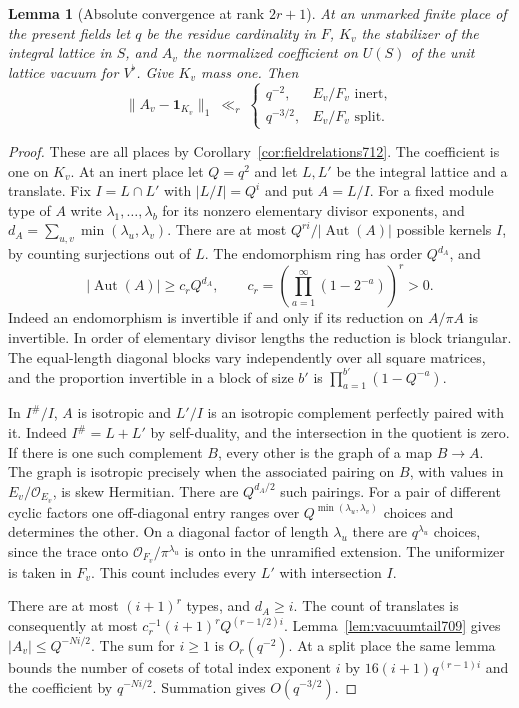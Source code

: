 \documentclass[a4paper,11pt]{article}
\newtheorem{lemma}[proposition]{Lemma}
\theoremstyle{definition}
\theoremstyle{remark}
\numberwithin{equation}{section}
\begin{document}
\begin{lemma}[Absolute convergence at rank \(2r+1\)]
\leavevmode\label{lem:thresholdtail816}
At an unmarked finite place of the present fields let
\(q\) be the residue cardinality in \(F\), \(K_v\) the
stabilizer of the integral lattice in \(S\), and \(A_v\)
the normalized coefficient on \(U(S)\) of the unit lattice
vacuum for \(V^\flat\). Give \(K_v\) mass one. Then
\[
     \|A_v-\mathbf 1_{K_v}\|_1
     \ \ll_r\
     \begin{cases}
       q^{-2},&E_v/F_v\text{ inert},\\
       q^{-3/2},&E_v/F_v\text{ split}.
     \end{cases}
\]
\end{lemma}
\begin{proof}
These are all places by Corollary~\ref{cor:fieldrelations712}.
The coefficient is one on \(K_v\). At an inert place let
\(Q=q^2\) and let \(L,L'\) be the integral lattice and a
translate. Fix \(I=L\cap L'\) with \(|L/I|=Q^i\) and put
\(A=L/I\). For a fixed module type of \(A\) write
\(\lambda_1,\ldots,\lambda_b\) for its nonzero elementary
divisor exponents, and \(d_A=\sum_{u,v}\min(\lambda_u,\lambda_v)\).
There are at most \(Q^{ri}/|\operatorname{Aut}(A)|\)
possible kernels \(I\), by counting surjections out of \(L\).
The endomorphism ring has order \(Q^{d_A}\), and
\[
   |\operatorname{Aut}(A)|\ge c_r Q^{d_A},\qquad
   c_r=\left(\prod_{a=1}^{\infty}(1-2^{-a})\right)^r>0 .
\]
Indeed an endomorphism is invertible if and only if its
reduction on \(A/\pi A\) is invertible. In order of
elementary divisor lengths the reduction is block triangular.
The equal-length diagonal blocks vary independently over
all square matrices, and the proportion invertible in
a block of size \(b'\) is \(\prod_{a=1}^{b'}(1-Q^{-a})\).

In \(I^\#/I\), \(A\) is isotropic and \(L'/I\) is an
isotropic complement perfectly paired with it. Indeed
\(I^\#=L+L'\) by self-duality, and the intersection in
the quotient is zero. If there is one such complement \(B\),
every other is the graph of a map \(B\to A\).
The graph is isotropic precisely when the associated
pairing on \(B\), with values in \(E_v/\mathcal O_{E_v}\),
is skew Hermitian. There are \(Q^{d_A/2}\) such pairings.
For a pair of different cyclic factors one off-diagonal
entry ranges over \(Q^{\min(\lambda_u,\lambda_v)}\) choices
and determines the other. On a diagonal factor of length
\(\lambda_u\) there are \(q^{\lambda_u}\) choices, since
the trace onto \(\mathcal O_{F_v}/\pi^{\lambda_u}\) is onto
in the unramified extension. The uniformizer is taken in
\(F_v\). This count includes every \(L'\) with intersection
\(I\).

There are at most \((i+1)^r\) types, and \(d_A\ge i\).
The count of translates is consequently at most
\(c_r^{-1}(i+1)^r Q^{(r-1/2)i}\). Lemma~\ref{lem:vacuumtail709}
gives \(|A_v|\le Q^{-Ni/2}\). The sum for \(i\ge1\)
is \(O_r(q^{-2})\).
At a split place the same lemma bounds the number of
cosets of total index exponent \(i\) by
\(16(i+1)q^{(r-1)i}\) and the coefficient by \(q^{-Ni/2}\).
Summation gives \(O(q^{-3/2})\).
\end{proof}
\end{document}
